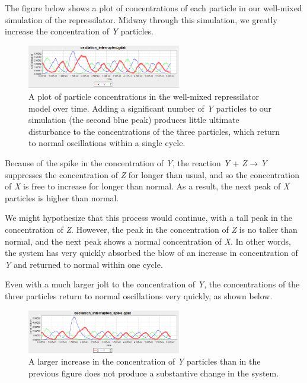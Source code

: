 The figure below shows a plot of concentrations of each particle in our well-mixed simulation of the repressilator.  Midway through this simulation, we greatly increase the concentration of \textit{Y} particles.

\begin{figure}[h]
\centering
\mySfFamily
\includegraphics[width = 0.6\textwidth]{../images/nf_sim_interrupted_chart.png}
\caption{A plot of particle concentrations in the well-mixed repressilator model over time. Adding a significant number of \textit{Y} particles to our simulation (the second blue peak) produces little ultimate disturbance to the concentrations of the three particles, which return to normal oscillations within a single cycle.}
\label{fig:nf_sim_interrupted_chart}
\end{figure}

Because of the spike in the concentration of \textit{Y}, the reaction \textit{Y} + \textit{Z} → \textit{Y} suppresses the concentration of \textit{Z} for longer than usual, and so the concentration of \textit{X} is free to increase for longer than normal. As a result, the next peak of \textit{X} particles is higher than normal.

We might hypothesize that this process would continue, with a tall peak in the concentration of \textit{Z}. However, the peak in the concentration of \textit{Z} is no taller than normal, and the next peak shows a normal concentration of \textit{X}. In other words, the system has very quickly absorbed the blow of an increase in concentration of \textit{Y} and returned to normal within one cycle.

Even with a much larger jolt to the concentration of \textit{Y}, the concentrations of the three particles return to normal oscillations very quickly, as shown below.

\begin{figure}[h]
\centering
\mySfFamily
\includegraphics[width = 0.6\textwidth]{../images/nf_sim_interrupted_chart_spike.png}
\caption{A larger increase in the concentration of \textit{Y} particles than in the previous figure does not produce a substantive change in the system.}
\label{fig:nf_sim_interrupted_chart_spike}
\end{figure}

